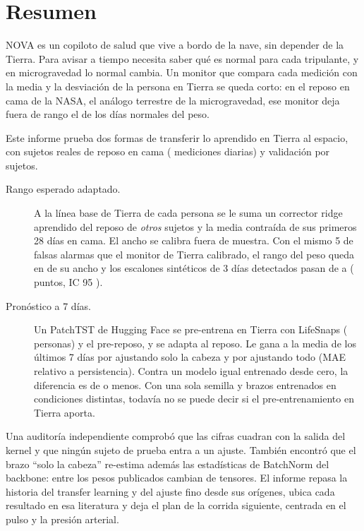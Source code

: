 \chapter*{Resumen}

NOVA es un copiloto de salud que vive a bordo de la nave, sin depender de la Tierra. Para avisar a tiempo necesita
saber qué es normal para cada tripulante, y en microgravedad lo normal cambia. Un monitor que compara cada medición con
la media y la desviación de la persona en Tierra se queda corto: en el reposo en cama de la NASA, el análogo terrestre
de la microgravedad, ese monitor deja fuera de rango el \pct{} de los días normales del peso.

Este informe prueba dos formas de transferir lo aprendido en Tierra al espacio, con  sujetos
reales de reposo en cama ( mediciones diarias) y validación por sujetos.

\begin{description}
\item[Rango esperado adaptado.] A la línea base de Tierra de cada persona se le suma un corrector ridge aprendido del
  reposo de \emph{otros} sujetos y la media contraída de sus primeros 28 días en cama. El ancho se calibra fuera de
  muestra. Con el mismo 5\pct{} de falsas alarmas que el monitor de Tierra calibrado, el rango del peso queda en
   de su ancho y los escalones sintéticos de 3 días detectados pasan de
  \pct{} a \pct{} ( puntos, IC 95\pct{}
  ).
\item[Pronóstico a 7 días.] Un PatchTST de Hugging Face se pre-entrena en Tierra con LifeSnaps
  ( personas) y el pre-reposo, y se adapta al reposo. Le gana a la media de los últimos 7 días
  por  ajustando solo la cabeza y por  ajustando todo (MAE relativo
  a persistencia). Contra un modelo igual entrenado desde cero, la diferencia es de  o menos.
  Con una sola semilla y brazos entrenados en condiciones distintas, todavía no se puede decir si el pre-entrenamiento
  en Tierra aporta.
\end{description}

Una auditoría independiente comprobó que las cifras cuadran con la salida del kernel y que ningún sujeto de prueba
entra a un ajuste. También encontró que el brazo \enquote{solo la cabeza} re-estima además las estadísticas de
BatchNorm del backbone: entre los pesos publicados cambian  de  tensores.
El informe repasa la historia del transfer learning y del ajuste fino desde sus orígenes, ubica cada resultado en esa
literatura y deja el plan de la corrida siguiente, centrada en el pulso y la presión arterial.

